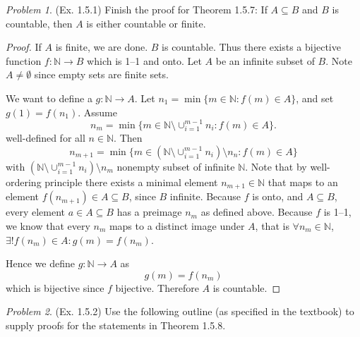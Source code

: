 \documentclass[11pt,twoside, reqno]{amsart}
\theoremstyle{remark}
\newtheorem{Prob}{Problem}
\def\N{\mathbb N}
\begin{document}
\begin{Prob}(Ex. 1.5.1) Finish the proof for Theorem 1.5.7: If $A\subseteq B$ and $B$ is countable, then $A$ is either countable or finite.
\end{Prob}

\begin{proof}
If $A$ is finite, we are done. $B$ is countable. Thus there exists a bijective function $f:\N \to B$ which is 1--1 and onto. Let $A$ be an infinite subset of $B$. Note $A \neq \emptyset$ since empty sets are finite sets.

We want to define a $g:\N \to A$. Let $n_1 = \min \{m \in \N : f(m) \in A\}$, and set $g(1) = f(n_1)$. Assume
$$
n_m = \min \{m \in \N \setminus \cup^{m-1}_{i=1}n_i : f(m) \in A\}.
$$
well-defined for all $n \in \N$. Then
$$
n_{m+1} = \min \{m \in (\N \setminus \cup^{m-1}_{i=1}n_i) \setminus n_n : f(m) \in A\}
$$
with $(\N \setminus \cup^{m-1}_{i=1}n_i) \setminus n_m$ nonempty subset of infinite $\N$. Note that by well-ordering principle there exists a minimal element $n_{m+1} \in \N$ that maps to an element $f(n_{m+1}) \in A \subseteq B$, since $B$ infinite. Because $f$ is onto, and $A \subseteq B$, every element $a \in A \subseteq B$ has a preimage $n_m$ as defined above. Because $f$ is 1--1, we know that every $n_m$ maps to a distinct image under $A$, that is $\forall n_m \in \N$, $\exists! f(n_m) \in A : g(m) = f(n_m)$.

Hence we define $g:\N \to A$ as
$$
g(m) = f(n_m)
$$
which is bijective since $f$ bijective. Therefore $A$ is countable.
\end{proof}


\begin{Prob}(Ex. 1.5.2) Use the following outline (as specified in the textbook) to supply proofs for the statements in Theorem 1.5.8.
\end{Prob}
\end{document}
